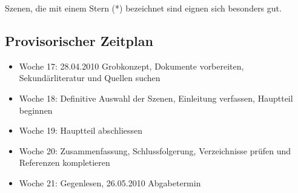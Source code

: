 \documentclass[a4paper,titlepage]{scrartcl}
\begin{document}
Szenen, die mit einem Stern (*) bezeichnet sind eignen sich besonders gut.

\subsection{Provisorischer Zeitplan}

\begin{itemize}
    \item{Woche 17: 28.04.2010 Grobkonzept, Dokumente vorbereiten, Sekundärliteratur und Quellen 
        suchen}
    \item{Woche 18: Definitive Auswahl der Szenen, Einleitung verfassen, Hauptteil beginnen}
    \item{Woche 19: Hauptteil abschliessen}
    \item{Woche 20: Zusammenfassung, Schlussfolgerung, Verzeichnisse prüfen und Referenzen
        kompletieren}
    \item{Woche 21: Gegenlesen, 26.05.2010 Abgabetermin}
\end{itemize}
\end{document}
